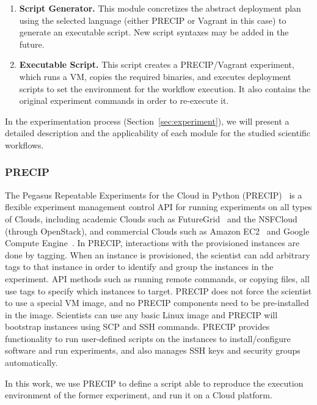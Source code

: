 \begin{enumerate}
	\item \textbf{Script Generator.} This module concretizes the abstract deployment plan using the selected
		language (either PRECIP or Vagrant in this case) to generate an executable script. New script syntaxes 
		may be added in the future.

	\item \textbf{Executable Script.} This script creates a PRECIP/Vagrant experiment, which runs a VM, 
		copies the required binaries, and executes deployment scripts to set the environment for the 
		workflow execution. It also contains the original experiment commands in order to 
		re-execute it.

\end{enumerate}

In the experimentation process (Section~\ref{sec:experiment}), we will present a detailed description 
and the applicability of each module for the studied scientific workflows.



\subsubsection{PRECIP}
The Pegasus Repeatable Experiments for the Cloud in Python (PRECIP)~\cite{Azarnoosh-CRC-2013} 
is a flexible experiment management control API for running experiments on all types of Clouds, 
including academic Clouds such as FutureGrid~\cite{futuregrid} and the NSFCloud~\cite{chameleon,cloudlab}
(through OpenStack), and commercial Clouds such as Amazon EC2~\cite{aws} and Google 
Compute Engine~\cite{gce}. In PRECIP, interactions with the provisioned instances are done by 
tagging. When an instance is provisioned, the scientist can add arbitrary tags to that instance in 
order to identify and group the instances in the experiment. API methods such as running remote 
commands, or copying files, all use tags to specify which instances to target. PRECIP does not 
force the scientist to use a special VM image, and no PRECIP components need to be pre-installed 
in the image. Scientists can use any basic Linux image and PRECIP will bootstrap instances using 
SCP and SSH commands. PRECIP provides functionality to run user-defined scripts on the instances 
to install/configure software and run experiments, and also manages SSH keys and security groups 
automatically.

In this work, we use PRECIP to define a script able to reproduce the execution environment of the 
former experiment, and run it on a Cloud platform.


